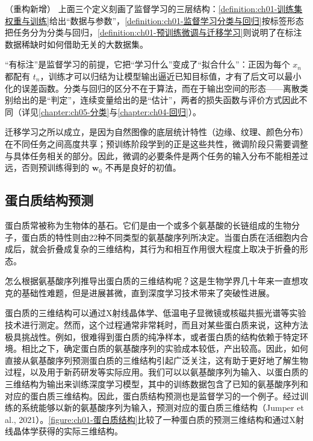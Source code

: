 \documentclass[../../main.tex]{subfiles}
\begin{document}
\begin{remark}（重构新增）
上面三个定义刻画了监督学习的三层结构：\cref{definition:ch01-训练集权重与训练}给出“数据与参数”，\cref{definition:ch01-监督学习分类与回归}按标签形态把任务分为分类与回归，\cref{definition:ch01-预训练微调与迁移学习}则说明了在标注数据稀缺时如何借助无关的大数据集。

“有标注”是监督学习的前提，它把“学习什么”变成了“拟合什么”：正因为每个 $x_n$ 都配有 $t_n$，训练才可以归结为让模型输出逼近已知目标值，才有了后文可以最小化的误差函数。分类与回归的区分不在于算法，而在于输出空间的形态——离散类别给出的是“判定”，连续变量给出的是“估计”，两者的损失函数与评价方式因此不同（详见\cref{chapter:ch05-分类}与\cref{chapter:ch04-回归}）。

迁移学习之所以成立，是因为自然图像的底层统计特性（边缘、纹理、颜色分布）在不同任务之间高度共享；预训练阶段学到的正是这些共性，微调阶段只需要调整与具体任务相关的部分。因此，微调的必要条件是两个任务的输入分布不能相差过远，否则预训练得到的 $\mathbf{w}_{0}$ 不再是良好的初值。
\end{remark}

\subsection{蛋白质结构预测}\label{subsection:ch01-蛋白质结构预测}

蛋白质常被称为生物体的基石。它们是由一个或多个氨基酸的长链组成的生物分子，蛋白质的特性则由22种不同类型的氨基酸序列所决定。当蛋白质在活细胞内合成后，就会折叠成复杂的三维结构，其行为和相互作用很大程度上取决于折叠的形态。

怎么根据氨基酸序列推导出蛋白质的三维结构呢？这是生物学界几十年来一直想攻克的基础性难题，但是进展甚微，直到深度学习技术带来了突破性进展。

蛋白质的三维结构可以通过X射线晶体学、低温电子显微镜或核磁共振光谱等实验技术进行测定。然而，这个过程通常非常耗时，而且对某些蛋白质来说，这种方法极具挑战性。例如，很难得到蛋白质的纯净样本，或者蛋白质的结构依赖于特定环境。相比之下，确定蛋白质的氨基酸序列的实验成本较低，产出较高。因此，如何直接从氨基酸序列预测蛋白质的三维结构引起广泛关注，这有助于更好地了解生物过程，以及用于新药研发等实际应用。我们可以以氨基酸序列为输入、以蛋白质的三维结构为输出来训练深度学习模型，其中的训练数据包含了已知的氨基酸序列和对应的蛋白质三维结构。因此，蛋白质结构预测也是监督学习的一个例子。经过训练的系统能够以新的氨基酸序列为输入，预测对应的蛋白质三维结构（Jumper et al., 2021）。\cref{figure:ch01-蛋白质结构}比较了一种蛋白质的预测三维结构和通过X射线晶体学获得的实际三维结构。
\end{document}
